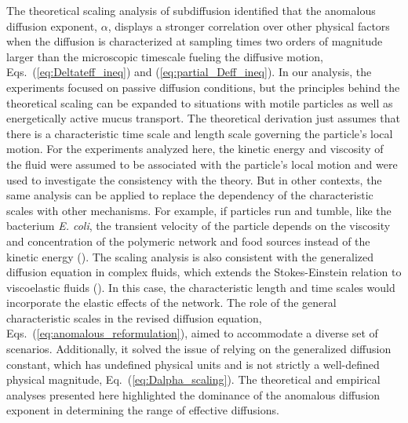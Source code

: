 \documentclass[aps,prl,preprint,superscriptaddress,showkeys,linenumbers]{revtex4-1}
\begin{document}
The theoretical scaling analysis of subdiffusion identified \textcolor{Antonio}{ that the anomalous diffusion exponent, $\alpha$, displays a stronger correlation} over other physical factors when the diffusion is characterized at sampling times two orders of magnitude larger than the microscopic timescale fueling the diffusive motion, Eqs.~(\ref{eq:Deltateff_ineq}) and (\ref{eq:partial_Deff_ineq}). In our analysis, the experiments focused on passive diffusion conditions, but the principles behind the theoretical scaling can be expanded to situations with motile particles as well as energetically active mucus transport. The theoretical derivation just assumes that there is a characteristic time scale and length scale governing the particle's local motion. For the experiments analyzed here, the kinetic energy and viscosity of the fluid were assumed to be associated with the particle's local motion and were used to investigate the consistency with the theory. But in other contexts, the same analysis can be applied to replace the dependency of the characteristic scales with other mechanisms. For example, if particles run and tumble, like the bacterium \textit{E. coli}, the transient velocity of the particle depends on the viscosity and concentration of the polymeric network and food sources instead of the kinetic energy (\cite{Martinez2014PNAS,Patteson2015SciRep}). The scaling analysis is also consistent with the generalized diffusion equation in complex fluids, which extends the Stokes-Einstein relation to viscoelastic fluids (\cite{SpagnSPRINGER2015}). In this case, the characteristic length and time scales would incorporate the elastic effects of the network. The role of the general characteristic scales in the revised diffusion equation, Eqs.~(\ref{eq:anomalous_reformulation}), aimed to accommodate a diverse set of scenarios. Additionally, it solved the issue of relying on the generalized diffusion constant, which has undefined physical units and is not \textcolor{Antonio}{strictly a well-defined} physical magnitude, Eq.~(\ref{eq:Dalpha_scaling}). The theoretical and empirical analyses presented here highlighted the dominance of the anomalous diffusion exponent in determining the range of effective diffusions.
\end{document}
